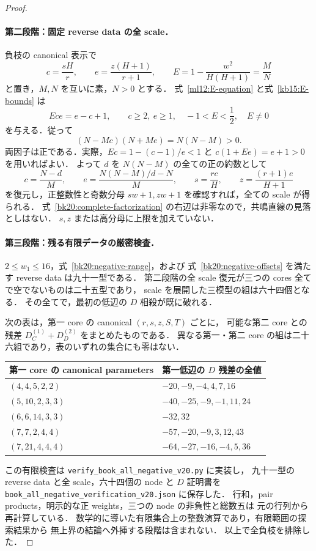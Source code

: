 \begin{proof}
\paragraph{第二段階：固定 reverse data の全 scale．}
負枝の canonical 表示で
\[
 c=\frac{sH}{r},\qquad e=\frac{z(H+1)}{r+1},\qquad
 E=1-\frac{w^2}{H(H+1)}=\frac MN
\]
と置き，$M,N$ を互いに素，$N>0$ とする．
式~\eqref{ml12:E-equation} と式~\eqref{kb15:E-bounds} は
\[
 Ece=e-c+1,\qquad c\ge2,\ e\ge1,\quad -1<E<\frac12,\quad E\ne0
\]
を与える．従って
\begin{equation}\label{bk20:complete-factorization}
 (N-Mc)(N+Me)=N(N-M)>0.
\end{equation}
両因子は正である．実際，$Ec=1-(c-1)/e<1$ と
$c(1+Ee)=e+1>0$ を用いればよい．
よって $d$ を $N(N-M)$ の全ての正の約数として
\[
 c=\frac{N-d}{M},\qquad
 e=\frac{N(N-M)/d-N}{M},\qquad
 s=\frac{rc}{H},\qquad z=\frac{(r+1)e}{H+1}
\]
を復元し，正整数性と奇数分母 $sw+1,zw+1$ を確認すれば，全ての scale が得られる．
式~\eqref{bk20:complete-factorization} の右辺は非零なので，共鳴直線の見落としはない．
$s,z$ または高分母に上限を加えていない．

\paragraph{第三段階：残る有限データの厳密検査．}
$2\le w_1\le16$，式~\eqref{bk20:negative-range}，および
式~\eqref{bk20:negative-offsets} を満たす reverse data は九十一型である．
第二段階の全 scale 復元が三つの cores 全てで空でないものは二十五型であり，
scale を展開した三模型の組は六十四個となる．
その全てで，最初の低辺の $D$ 相殺が既に破れる．

次の表は，第一 core の canonical $(r,s,z,S,T)$ ごとに，
可能な第二 core との残差 $D_C^{(1)}+D_D^{(2)}$ をまとめたものである．
異なる第一・第二 core の組は二十六組であり，表のいずれの集合にも零はない．
\begin{center}
\small
\begin{tabular}{ll}
第一 core の canonical parameters & 第一低辺の $D$ 残差の全値\\
\hline
$(4,4,5,2,2)$ & $-20,-9,-4,4,7,16$\\
$(5,10,2,3,3)$ & $-40,-25,-9,-1,11,24$\\
$(6,6,14,3,3)$ & $-32,32$\\
$(7,7,2,4,4)$ & $-57,-20,-9,3,12,43$\\
$(7,21,4,4,4)$ & $-64,-27,-16,-4,5,36$\\
\end{tabular}
\end{center}

この有限検査は \nolinkurl{verify_book_all_negative_v20.py} に実装し，
九十一型の reverse data と全 scale，六十四個の node と $D$ 証明書を
\nolinkurl{book_all_negative_verification_v20.json} に保存した．
行和，pair products，明示的な正 weights，三つの node の非負性と総数五は
元の行列から再計算している．
数学的に導いた有限集合上の整数演算であり，有限範囲の探索結果から
無上界の結論へ外挿する段階は含まれない．
以上で全負枝を排除した．
\end{proof}

